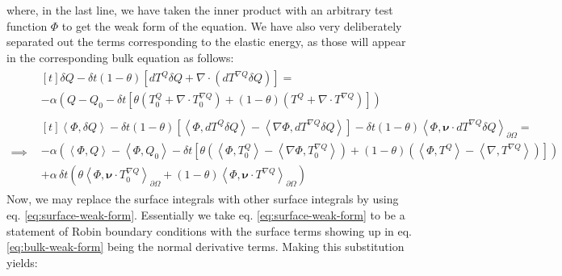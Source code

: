 \documentclass[reqno]{article}
\begin{document}
where, in the last line, we have taken the inner product with an arbitrary test function $\Phi$ to get the weak form of the equation.
We have also very deliberately separated out the terms corresponding to the elastic energy, as those will appear in the corresponding bulk equation as follows:
\begin{equation} \label{eq:bulk-weak-form}
\begin{split}
&\begin{multlined}[t]
    \delta Q - \delta t \left(1 - \theta \right) \left[dT^Q \delta Q + \nabla \cdot \left( dT^{\nabla Q} \delta Q \right)\right] 
    = \\
    - \alpha \left( 
        Q - Q_0 - \delta t \left[ 
            \theta \left(T_0^Q + \nabla \cdot T_0^{\nabla Q} \right)
            + \left(1 - \theta \right) \left( T^Q + \nabla \cdot T^{\nabla Q} \right)
        \right]
    \right)
\end{multlined} \\
\implies
&\begin{multlined}[t]
    \left<\Phi, \delta Q\right> 
    - \delta t \left(1 - \theta \right) \left[
        \left<\Phi, dT^Q \delta Q\right> 
        - \left<\nabla \Phi, dT^{\nabla Q} \delta Q \right>
    \right] 
    - \delta t \left(1 - \theta \right) \left< \Phi, \boldsymbol\nu \cdot dT^{\nabla Q} \delta Q\right>_{\partial \Omega}
    = \\
    - \alpha \left( 
        \left<\Phi, Q\right> - \left<\Phi, Q_0\right> - \delta t \left[ 
            \theta \left(\left<\Phi, T_0^Q\right> - \left<\nabla \Phi, T_0^{\nabla Q} \right> \right)
            + \left(1 - \theta \right) \left( \left<\Phi, T^Q\right> - \left<\nabla, T^{\nabla Q} \right> \right)
        \right]
    \right) \\
    + \alpha \, \delta t \left(
        \theta \left<\Phi, \boldsymbol\nu \cdot T_0^{\nabla Q}\right>_{\partial \Omega}
        + \left(1 - \theta\right) \left<\Phi, \boldsymbol\nu \cdot T^{\nabla Q} \right>_{\partial \Omega}
    \right)
\end{multlined}
\end{split}
\end{equation}
Now, we may replace the surface integrals with other surface integrals by using eq. \eqref{eq:surface-weak-form}.
Essentially we take eq. \eqref{eq:surface-weak-form} to be a statement of Robin boundary conditions with the surface terms showing up in eq. \eqref{eq:bulk-weak-form} being the normal derivative terms.
Making this substitution yields:
\end{document}
